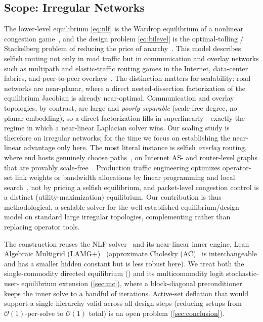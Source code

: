 \documentclass[ijoc]{informs3}
\begin{document}
\subsection{Scope: Irregular Networks}
The lower-level equilibrium \cref{eq:nlf} is the Wardrop equilibrium of a nonlinear congestion
game~\citep{rosenthal1973,roughgarden2002}, and the design problem \cref{eq:bilevel} is the optimal-tolling /
Stackelberg problem of reducing the price of anarchy~\citep{swamy2012,korilis1997}. This model describes selfish
routing not only in road traffic but in communication and overlay networks such as multipath and elastic-traffic
routing games in the Internet, data-center fabrics, and peer-to-peer overlays~\citep{orda1993,larroca2013}. The
distinction matters for scalability: road networks are near-planar, where a direct nested-dissection
factorization of the equilibrium Jacobian is already near-optimal. Communication and overlay topologies, by contrast, are large and \emph{poorly separable} (scale-free
degree, no planar embedding), so a direct factorization fills in superlinearly---exactly the regime in which a
near-linear Laplacian solver wins. Our scaling study is therefore on irregular networks; for the time we focus on establishing the near-linear advantage only here. The most literal instance is selfish
\emph{overlay} routing, where end hosts genuinely choose paths~\citep{qiu2003}, on Internet AS- and router-level
graphs that are provably scale-free~\citep{faloutsos1999}. Production traffic engineering
optimizes operator-set link weights or bandwidth allocations by linear programming and local
search~\citep{fortz2000}, not by pricing a selfish equilibrium, and packet-level congestion control is a distinct
(utility-maximization) equilibrium. Our contribution is thus methodological, a scalable solver for the well-established
equilibrium/design model on standard large irregular topologies, complementing rather than replacing
operator tools.

The construction reuses the NLF solver~\citep{nlf} and its near-linear inner engine,
Lean Algebraic Multigrid (LAMG$+$)~\citep{lamgplus} (approximate Cholesky (AC)~\citep{kyngsachdeva2016} is interchangeable and has a smaller hidden constant but is less robust here). We treat both the single-commodity
directed equilibrium () and its multicommodity logit stochastic-user-
equilibrium extension (\cref{sec:mc}), where a block-diagonal preconditioner keeps the inner solve
to a handful of iterations. Active-set deflation that would support a single hierarchy valid across all design steps (reducing setups from $\mathcal{O}(1)$-per-solve to $\mathcal{O}(1)$
total) is an open problem (\cref{sec:conclusion}).
\end{document}
